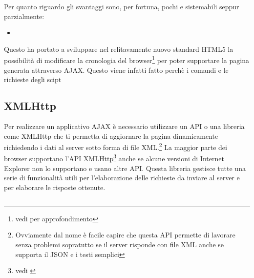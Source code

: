 \documentclass{article}
\begin{document}
Per quanto riguardo gli svantaggi sono, per fortuna, pochi e sistemabili seppur parzialmente:
\begin{itemize}
\item 
\end{itemize}

Questo ha portato a sviluppare nel relitavamente nuovo standard HTML5 la possibilità di modificare la cronologia del browser\footnote{vedi \textcites{site:w3chtml5} per approfondimento} per poter supportare la pagina generata attraverso AJAX. Questo viene infatti fatto perchè i comandi e le richieste degli scipt 

\subsection{XMLHttp} Per realizzare un applicativo AJAX è necessario utilizzare un API o una libreria come XMLHttp che ti permetta di aggiornare la pagina dinamicamente richiedendo i dati al server sotto forma di file XML.\footnote{Ovviamente dal nome è facile capire che questa API permette di lavorare senza problemi sopratutto se il server risponde con file XML anche se supporta il JSON e i testi semplici} 
La maggior parte dei browser supportano l'API XMLHttp\footnote{vedi \textcites{site:xmlhttpcompatibilita}} anche se alcune versioni di Internet Explorer non lo supportano e usano altre API.
Questa libreria gestisce tutte una serie di funzionalità utili per l'elaborazione delle richieste da inviare al server e per elaborare le risposte ottenute.

\newpage
\subsection*{\refname}
\printbibliography[heading=web, nottype=book]
\printbibliography[heading=libri, type=book]
\end{document}
